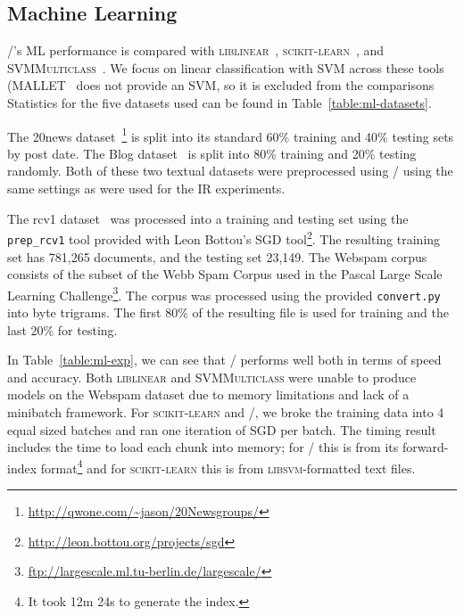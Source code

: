 





\subsection{Machine Learning}

\meta/'s ML performance is compared with \textsc{liblinear}~\cite{liblinear},
\textsc{scikit-learn}~\cite{scikit}, and
\textsc{SVMMulticlass}~\cite{svmmulticlass}. We focus on linear classification
with SVM across these tools (MALLET~\cite{mallet} does not provide an SVM, so it
is excluded from the comparisons
Statistics for the five datasets used can be found in
Table~\ref{table:ml-datasets}.

The 20news
dataset~\cite{Lang:1995:ICML}\footnote{\url{http://qwone.com/~jason/20Newsgroups/}}
is split into its standard 60\% training and 40\% testing sets by post
date. The Blog dataset~\cite{blog} is split into 80\% training and 20\%
testing randomly. Both of these two textual datasets were preprocessed
using \meta/ using the same settings as were used for the IR experiments.

The rcv1 dataset~\cite{rcv1} was processed into a training and testing set
using the \texttt{prep\_rcv1} tool provided with Leon Bottou's SGD
tool\footnote{\url{http://leon.bottou.org/projects/sgd}}. The resulting
training set has 781,265 documents, and the testing set 23,149. The Webspam
corpus~\cite{Webb:2006:CEAS} consists of the subset of the Webb Spam Corpus
used in the Pascal Large Scale Learning
Challenge\footnote{\url{ftp://largescale.ml.tu-berlin.de/largescale/}}.
The corpus was processed using the provided \texttt{convert.py} into byte
trigrams. The first 80\% of the resulting file is used for training and the
last 20\% for testing.

In Table~\ref{table:ml-exp}, we can see that \meta/ performs well both in
terms of speed and accuracy. Both \textsc{liblinear} and
\textsc{SVMMulticlass} were unable to produce models on the Webspam dataset
due to memory limitations and lack of a minibatch framework. For
\textsc{scikit-learn} and \meta/, we broke the training data into 4 equal
sized batches and ran one iteration of SGD per batch. The timing result
includes the time to load each chunk into memory; for \meta/ this is from
its forward-index format\footnote{It took 12m 24s to generate the index.}
and for \textsc{scikit-learn} this is from \textsc{libsvm}-formatted text
files.



